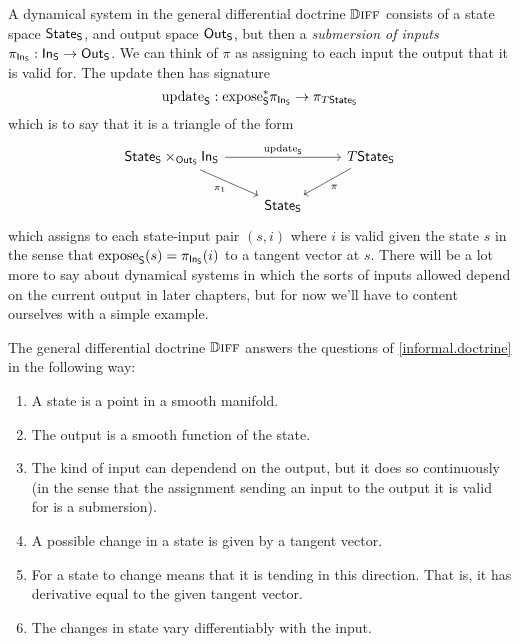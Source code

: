 \documentclass[DynamicalBook]{subfiles}
\begin{document}
A dynamical system in the general differential doctrine $\mathbb{D}\textsc{iff}$ consists of a
state space $\mathsf{State}_{\mathsf{S}}$, and output space $\mathsf{Out}_{\mathsf{S}}$, but then a \emph{submersion
of inputs} $\pi_{\mathsf{In}_{\mathsf{S}}} : \mathsf{In}_{\mathsf{S}} \to \mathsf{Out}_{\mathsf{S}}$. We can think of $\pi$ as assigning to
each input the output that it is valid for. The update then has signature 
$$\mathrm{update}_{\mathsf{S}} : \mathrm{expose}_{\mathsf{S}}^{\ast} \pi_{\mathsf{In}_{\mathsf{S}}} \to \pi_{T\mathsf{State}_{\mathsf{S}}}$$
which is to say that it is a triangle of the form
\[
\begin{tikzcd}
\State{S} \times_{\Out{S}} \In{S} \ar[dr, "\pi_1"'] \ar[rr, "\update{S}"] & & T\State{S} \ar[dl, "\pi"]
\\
& \State{S} &
\end{tikzcd}
\] 
which assigns to each state-input pair $(s, i)$ where $i$ is valid given the
state $s$ in the sense that $\mathrm{expose}_{\mathsf{S}}(s) = \pi_{\mathsf{In}_{\mathsf{S}}}(i)$ to a tangent
vector at $s$. There will be a lot more to say about dynamical systems in which
the sorts of inputs allowed depend on the current output in later chapters, but
for now we'll have to content ourselves with a simple example.

The general differential doctrine $\mathbb{D}\textsc{iff}$ answers the questions of
\cref{informal.doctrine} in the following way:
\begin{enumerate}
  \item A state is a point in a smooth manifold.
  \item The output is a smooth function of the state.
  \item The kind of input can dependend on the output, but it does so
    continuously (in the sense that the assignment sending an input to the
    output it is valid for is a submersion).
  \item A possible change in a state is given by a tangent vector.
  \item For a state to change means that it is tending in this direction. That
    is, it has derivative equal to the given tangent vector.
  \item The changes in state vary differentiably with the input.
\end{enumerate}
\end{document}

